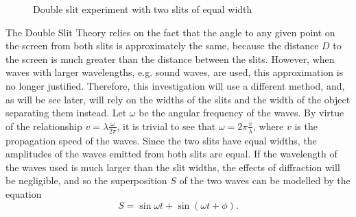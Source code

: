 \documentclass{paper}
\begin{document}
\begin{figure}[H]
    \caption{Double slit experiment with two slits of equal width}
    \label{fig:double-slit-raw}
\end{figure}
The Double Slit Theory relies on the fact that the angle to any given point on the screen from both slits
is approximately the same, because the distance $D$ to the screen is much greater than the distance between
the slits. However, when waves with larger wavelengths, e.g. sound waves, are used, this approximation is no
longer justified. Therefore, this investigation will use a different method, and, as will be see later,
will rely on the widths of the slits and the width of the object separating them instead.
Let $\omega$ be the angular frequency of the waves. By virtue of the relationship $v =                          \lambda\frac{\omega}{2\pi}$,
it is trivial to see that $\omega = 2\pi\frac{v}{\lambda}$, where $v$ is the propagation speed of the waves.
Since the two slits have equal widths, the amplitudes of the waves emitted from both
slits are equal. If the wavelength of the waves used is much larger than the slit widths,
the effects of diffraction will be negligible, and so the superposition $S$ of the two waves can be modelled by 
the equation 
\begin{equation}
    \label{eq:model-superposition-simple}
    S = \sin{\omega{}t} + \sin(\omega{}t + \phi).
\end{equation}
\end{document}
